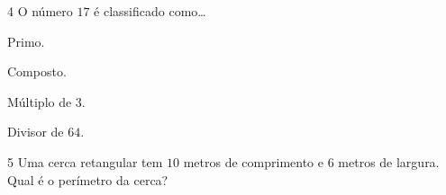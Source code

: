 
\num{4}  O número $17$ é classificado como\ldots{}

\begin{escolha}
\item
  Primo.
\item
  Composto.
\item
  Múltiplo de $3$.
\item
  Divisor de $64$.
\end{escolha}




\num{5}  Uma cerca retangular tem $10$ metros de comprimento e $6$ metros de
largura. Qual é o perímetro da cerca?

